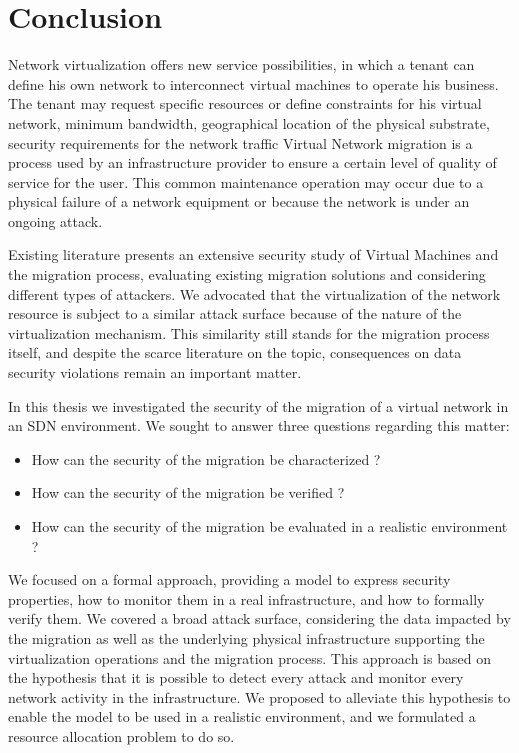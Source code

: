 \section{Conclusion}
\label{sec:thesis_conclusion}
Network virtualization offers new service possibilities, in which a tenant can define his own network to interconnect virtual machines to operate his business. The tenant may request specific resources or define constraints for his virtual network, \eg minimum bandwidth, geographical location of the physical substrate, security requirements for the network traffic \etc
Virtual Network migration is a process used by an infrastructure provider to ensure a certain level of quality of service for the user.
This common maintenance operation may occur due to a physical failure of a network equipment or because the network is under an ongoing attack.

Existing literature presents an extensive security study of Virtual Machines and the migration process, evaluating existing migration solutions and considering different types of attackers. We advocated that the virtualization of the network resource is subject to a similar attack surface because of the nature of the virtualization mechanism. This similarity still stands for the migration process itself, and despite the scarce literature on the topic, consequences on data security violations remain an important matter.

In this thesis we investigated the security of the migration of a virtual network in an SDN environment. 
We sought to answer three questions regarding this matter:

\begin{itemize}
    \item How can the security of the migration be characterized ?
    \item How can the security of the migration be verified ?
    \item How can the security of the migration be evaluated in a realistic environment ?
\end{itemize}

We focused on a formal approach, providing a model to express security properties, how to monitor them in a real infrastructure, and how to formally verify them. 
We covered a broad attack surface, considering the data impacted by the migration as well as the underlying physical infrastructure supporting the virtualization operations and the migration process. 
This approach is based on the hypothesis that it is possible to detect every attack and monitor every network activity in the infrastructure. 
We proposed to alleviate this hypothesis to enable the model to be used in a realistic environment, and we formulated a resource allocation problem to do so.

